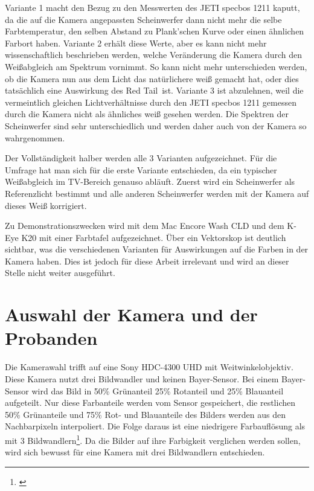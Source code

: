 Variante 1 macht den Bezug zu den Messwerten des JETI specbos 1211 kaputt, da die auf die Kamera angepassten Scheinwerfer dann nicht mehr die selbe Farbtemperatur, den selben Abstand zu Plank'schen Kurve oder einen ähnlichen Farbort haben. Variante 2 erhält diese Werte, aber es kann nicht mehr wissenschaftlich beschrieben werden, welche Veränderung die Kamera durch den Weißabgleich am Spektrum vornimmt. So kann nicht mehr unterschieden werden, ob die Kamera nun aus dem Licht das natürlichere weiß gemacht hat, oder dies tatsächlich eine Auswirkung des \glqq Red Tail\grqq\ ist.
Variante 3 ist abzulehnen, weil die vermeintlich gleichen Lichtverhältnisse durch den JETI specbos 1211 gemessen durch die Kamera nicht als ähnliches weiß gesehen werden. Die Spektren der Scheinwerfer sind sehr unterschiedlich und werden daher auch von der Kamera so wahrgenommen.

Der Vollständigkeit halber werden alle 3 Varianten aufgezeichnet. Für die Umfrage hat man sich für die erste Variante entschieden, da ein typischer Weißabgleich im TV-Bereich genauso abläuft. Zuerst wird ein Scheinwerfer als Referenzlicht bestimmt und alle anderen Scheinwerfer werden mit der Kamera auf dieses Weiß korrigiert. 

Zu Demonstrationszwecken wird mit dem Mac Encore Wash CLD und dem K-Eye K20 mit einer Farbtafel aufgezeichnet. Über ein Vektorskop ist deutlich sichtbar, was die verschiedenen Varianten für Auswirkungen auf die Farben in der Kamera haben. Dies ist jedoch für diese Arbeit irrelevant und wird an dieser Stelle nicht weiter ausgeführt. %

\section{Auswahl der Kamera und der Probanden}
\label{sec_wahlderKamera}

Die Kamerawahl trifft auf eine Sony HDC-4300 UHD mit Weitwinkelobjektiv. Diese Kamera nutzt drei Bildwandler und keinen Bayer-Sensor. Bei einem Bayer-Sensor wird das Bild in 50\% Grünanteil 25\% Rotanteil und 25\% Blauanteil aufgeteilt. Nur diese Farbanteile werden vom Sensor gespeichert, die restlichen 50\% Grünanteile und 75\% Rot- und Blauanteile des Bilders werden aus den Nachbarpixeln interpoliert. Die Folge daraus ist eine niedrigere Farbauflösung als mit 3 Bildwandlern\footnote{\cite[380-381]{schmidt}}. Da die Bilder auf ihre Farbigkeit verglichen werden sollen, wird sich bewusst für eine Kamera mit drei Bildwandlern entschieden.\\

